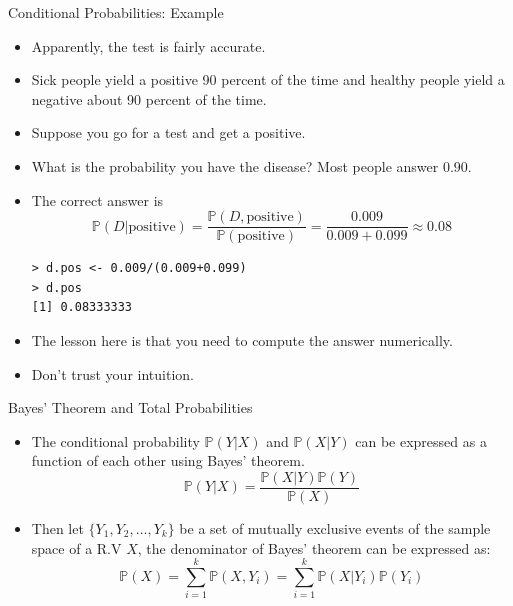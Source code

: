 \documentclass[handout]{beamer}
\begin{document}
\begin{frame}[fragile]{Conditional Probabilities: Example}
\scriptsize{
\begin{itemize}
\item Apparently, the test is fairly accurate. 
\item Sick people yield a positive 90 percent of the time and healthy people yield a negative about 90 percent of the time.
\item Suppose you go for a test and get a positive. 
\item What is the probability you have the disease? Most people answer $0.90$. 
\item The correct answer is
\begin{displaymath}
\mathbb{P}(D|\text{positive}) = \frac{\mathbb{P}(D,\text{positive})}{\mathbb{P}(\text{positive})}  = \frac{0.009}{0.009+0.099} \approx 0.08  
\end{displaymath}
\begin{verbatim}
> d.pos <- 0.009/(0.009+0.099)
> d.pos
[1] 0.08333333 
\end{verbatim}



\item The lesson here is that you need to compute the answer numerically. 
\item Don't trust your intuition.
 
\end{itemize}




} 
\end{frame}




\begin{frame}{Bayes' Theorem and Total Probabilities}
\scriptsize{
\begin{itemize}
 \item The conditional probability $\mathbb{P}(Y|X)$ and $\mathbb{P}(X|Y)$ can be expressed as a function of each other using Bayes' theorem.
\begin{displaymath}
 \mathbb{P}(Y|X)=\frac{\mathbb{P}(X|Y)\mathbb{P}(Y)}{\mathbb{P}(X)}
\end{displaymath}
\item Then let $\{ Y_1,Y_2,\dots, Y_k \} $ be a set of mutually exclusive events of the sample space of a R.V $X$, the denominator of Bayes' theorem can be expressed as:
\begin{displaymath}
\mathbb{P}(X)= \sum_{i=1}^{k} \mathbb{P}(X,Y_i) = \sum_{i=1}^{k} \mathbb{P}(X|Y_i)\mathbb{P}(Y_i)
\end{displaymath}
\end{itemize}
 
}
\end{frame}
\end{document}
